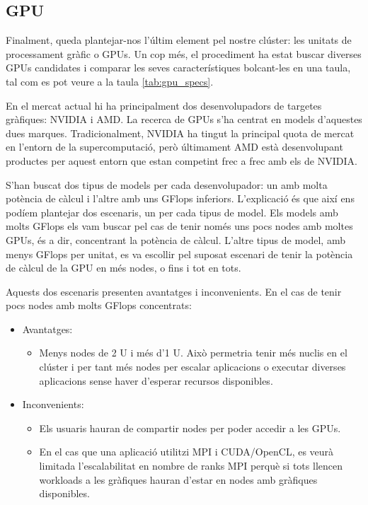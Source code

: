 \subsection{GPU}

Finalment, queda plantejar-nos l'últim element pel nostre clúster: les unitats de processament gràfic o GPUs. Un cop més, el procediment ha estat buscar diverses GPUs candidates i comparar les seves característiques bolcant-les en una taula, tal com es pot veure a la taula \ref{tab:gpu_specs}.



En el mercat actual hi ha principalment dos desenvolupadors de targetes gràfiques: NVIDIA i AMD. La recerca de GPUs s'ha centrat en models d'aquestes dues marques. Tradicionalment, NVIDIA ha tingut la principal quota de mercat en l'entorn de la supercomputació, però últimament AMD està desenvolupant productes per aquest entorn que estan competint frec a frec amb els de NVIDIA.

S'han buscat dos tipus de models per cada desenvolupador: un amb molta potència de càlcul i l'altre amb uns GFlops inferiors. L'explicació és que així ens podíem plantejar dos escenaris, un per cada tipus de model. 
Els models amb molts GFlops els vam buscar pel cas de tenir només uns pocs nodes amb moltes GPUs, és a dir, concentrant la potència de càlcul.
L'altre tipus de model, amb menys GFlops per unitat, es va escollir pel suposat escenari de tenir la potència de càlcul de la GPU en més nodes, o fins i tot en tots.

Aquests dos escenaris presenten avantatges i inconvenients. En el cas de tenir pocs nodes amb molts GFlops concentrats:
\begin{itemize}
    \item Avantatges:
    \begin{itemize}
        \item Menys nodes de 2 U i més d'1 U. Això permetria tenir més nuclis en el clúster i per tant més nodes per escalar aplicacions o executar diverses aplicacions sense haver d'esperar recursos disponibles.
    \end{itemize}
    \item Inconvenients:
    \begin{itemize}
        \item Els usuaris hauran de compartir nodes per poder accedir a les GPUs. 
        \item En el cas que una aplicació utilitzi MPI i CUDA/OpenCL, es veurà limitada l'escalabilitat en nombre de ranks MPI perquè si tots llencen workloads a les gràfiques hauran d'estar en nodes amb gràfiques disponibles.
    \end{itemize}
\end{itemize}

